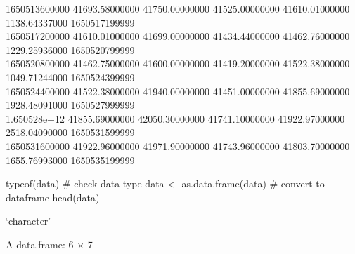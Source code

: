 \documentclass[
  letterpaper,
  DIV=11,
  numbers=noendperiod]{scrreprt}
\newenvironment{Shaded}{\begin{snugshade}}{\end{snugshade}}
\newcommand{\CommentTok}[1]{\textcolor[rgb]{0.37,0.37,0.37}{#1}}
\newcommand{\FunctionTok}[1]{\textcolor[rgb]{0.28,0.35,0.67}{#1}}
\newcommand{\NormalTok}[1]{\textcolor[rgb]{0.00,0.23,0.31}{#1}}
\newcommand{\OtherTok}[1]{\textcolor[rgb]{0.00,0.23,0.31}{#1}}
\begin{document}
1650513600000 \textbar{} 41693.58000000 \textbar{} 41750.00000000
\textbar{} 41525.00000000 \textbar{} 41610.01000000 \textbar{}
1138.64337000 \textbar{} 1650517199999 \textbar{}\\
1650517200000 \textbar{} 41610.01000000 \textbar{} 41699.00000000
\textbar{} 41434.44000000 \textbar{} 41462.76000000 \textbar{}
1229.25936000 \textbar{} 1650520799999 \textbar{}\\
1650520800000 \textbar{} 41462.75000000 \textbar{} 41600.00000000
\textbar{} 41419.20000000 \textbar{} 41522.38000000 \textbar{}
1049.71244000 \textbar{} 1650524399999 \textbar{}\\
1650524400000 \textbar{} 41522.38000000 \textbar{} 41940.00000000
\textbar{} 41451.00000000 \textbar{} 41855.69000000 \textbar{}
1928.48091000 \textbar{} 1650527999999 \textbar{}\\
1.650528e+12 \textbar{} 41855.69000000 \textbar{} 42050.30000000
\textbar{} 41741.10000000 \textbar{} 41922.97000000 \textbar{}
2518.04090000 \textbar{} 1650531599999 \textbar{}\\
1650531600000 \textbar{} 41922.96000000 \textbar{} 41971.90000000
\textbar{} 41743.96000000 \textbar{} 41803.70000000 \textbar{}
1655.76993000 \textbar{} 1650535199999 \textbar{}

\begin{Shaded}
\begin{Highlighting}[]
\FunctionTok{typeof}\NormalTok{(data) }\CommentTok{\# check data type}
\NormalTok{data }\OtherTok{\textless{}{-}} \FunctionTok{as.data.frame}\NormalTok{(data) }\CommentTok{\# convert to dataframe}
\FunctionTok{head}\NormalTok{(data)}
\end{Highlighting}
\end{Shaded}

`character'

A data.frame: 6 × 7
\end{document}

